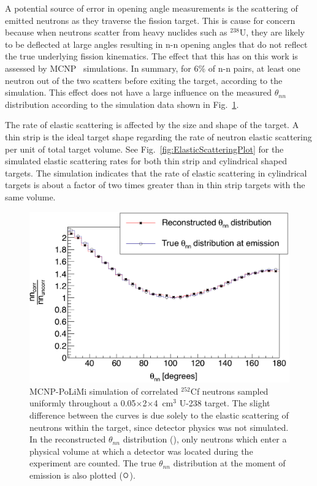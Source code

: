 \label{subsection:Elastic_scattering}
A potential source of error in opening angle measurements is the scattering of emitted neutrons as they traverse the fission target.
This is cause for concern because when neutrons scatter from heavy nuclides such as $^{238}$U, they are likely to be deflected at large angles resulting in n-n opening angles that do not reflect the true underlying fission kinematics.
The effect that this has on this work is assessed by MCNP~\cite{MCNP} simulations.
In summary, for 6\% of n-n pairs, at least one neutron out of the two scatters before exiting the target, according to the simulation.
This effect does not have a large influence on the measured $\theta_{nn}$ distribution according to the simulation data shown in Fig.~\ref{fig:ElasticScatteringEffect}.

The rate of elastic scattering is affected by the size and shape of the target.
A thin strip is the ideal target shape regarding the rate of neutron elastic scattering per unit of total target volume.
See Fig.~\ref{fig:ElasticScatteringPlot} for the simulated elastic scattering rates for both thin strip and cylindrical shaped targets.
The simulation indicates that the rate of elastic scattering in cylindrical targets is about a factor of two times greater than in thin strip targets with the same volume.
\begin{figure}
    \centering
    \includegraphics[width = \figsize\textwidth]{EffectOfElasticScattering.png}
    \caption{
    MCNP-PoLiMi simulation of correlated $^{252}$Cf neutrons sampled uniformly throughout a 0.05$\times$2$\times$4~cm$^3$ U-238 target.
    The slight difference between the curves is due solely to the elastic scattering of neutrons within the target, since detector physics was not simulated.
    In the reconstructed $\theta_{nn}$ distribution ({\tiny {}}), only neutrons which enter a physical volume at which a detector was located during the experiment are counted.
   The true $\theta_{nn}$ distribution at the moment of emission is also plotted ($\mathlarger{\mathlarger{\mathlarger{\circ}}}$).
    }
    \label{fig:ElasticScatteringEffect}
\end{figure}
